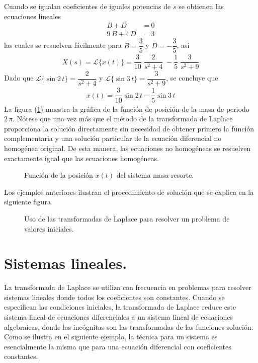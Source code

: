 Cuando se igualan coeficientes de iguales potencias de $s$ se obtienen las ecuaciones lineales
\begin{align*}
B + D &= 0 \\
9 \, B + 4 \, D &= 3
\end{align*}
las cuales se resuelven fácilmente para $B = \dfrac{3}{5}$ y $D = - \dfrac{3}{5}$, así
\begin{align*}
X(s) = \mathscr{L} \{x(t) \} = \dfrac{3}{10} \; \dfrac{2}{s^{2} + 4} \; - \dfrac{1}{5} \; \dfrac{3}{s^{2} + 9}
\end{align*}
Dado que $\mathscr{L} \{\sin 2 \, t \} = \dfrac{2}{s^{2} + 4}$ y $\mathscr{L} \{\sin 3 \, t \} = \dfrac{3}{s^{2} + 9}$, se concluye que
\begin{align*}
x(t) = \dfrac{3}{10} \sin 2 \, t - \dfrac{1}{5} \sin 3 \, t
\end{align*}
La figura (\ref{fig:figura_07_02_03}) muestra la gráfica de la función de posición de la masa de periodo $2 \, \pi$. Nótese que una vez más que el método de la transformada de Laplace proporciona la solución directamente sin necesidad de obtener primero la función complementaria y una solución particular de la ecuación diferencial no homogénea original. De esta manera, las ecuaciones no homogéneas se resuelven exactamente igual que las ecuaciones homogéneas.
\begin{figure}[!ht]
    \centering
    
    \caption{Función de la posición $x(t)$ del sistema masa-resorte.}
    \label{fig:figura_07_02_03}
\end{figure}
Los ejemplos anteriores ilustran el procedimiento de solución que se explica en la siguiente figura
\begin{figure}[!ht]
    \centering
    
    \caption{Uso de las transformadas de Laplace para resolver un problema de valores iniciales.}
    \label{fig:figura_07_02_04}
\end{figure}
\section{Sistemas lineales.}
La transformada de Laplace se utiliza con frecuencia en problemas para resolver sistemas lineales donde todos los coeficientes son constantes. Cuando se especifican las condiciones iniciales, la transformada de Laplace reduce este sistema lineal de ecuaciones diferenciales a un sistema lineal de ecuaciones algebraicas, donde las incógnitas son las transformadas de las funciones solución. Como se ilustra en el siguiente ejemplo, la técnica para un sistema es esencialmente la misma que para una ecuación diferencial con coeficientes constantes.
